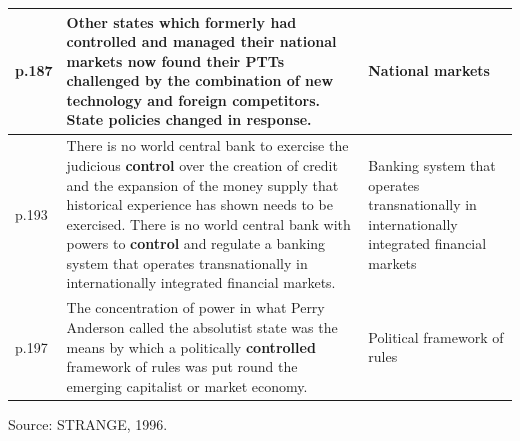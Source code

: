 \begin{longtable}{p{1.2cm} p{9.5cm} p{3.2cm}}
p.187 & Other states which formerly had \textbf{controlled} and managed their national markets now found their PTTs challenged by the combination of new technology and foreign competitors. State policies changed in response. & National markets \\
\midrule

p.193 & There is no world central bank to exercise the judicious \textbf{control} over the creation of credit and the expansion of the money supply that historical experience has shown needs to be exercised. There is no world central bank with powers to \textbf{control} and regulate a banking system that operates transnationally in internationally integrated financial markets. & Banking system that operates transnationally in internationally integrated financial markets \\
\midrule

p.197 & The concentration of power in what Perry Anderson called the absolutist state was the means by which a politically \textbf{controlled} framework of rules was put round the emerging capitalist or market economy. & Political framework of rules \\
\bottomrule
\end{longtable}

\noindent Source: STRANGE, 1996.

\normalsize

